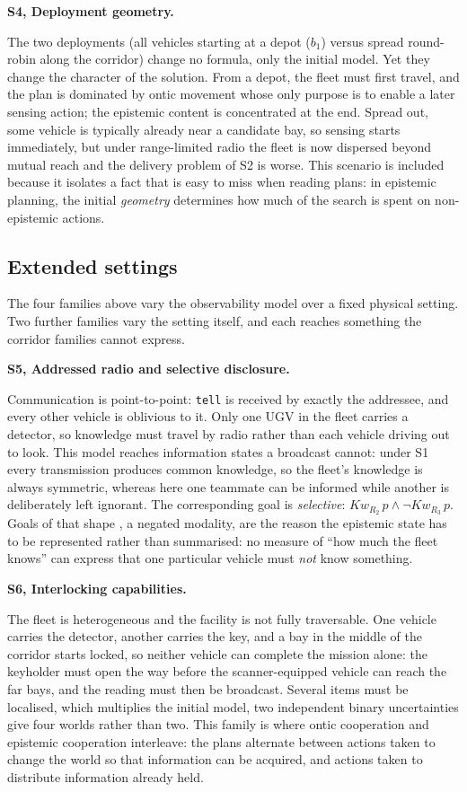 \documentclass[11pt,a4paper]{article}
\theoremstyle{definition}
\newcommand{\Kw}[1]{\mathit{Kw}_{#1}}
\newcommand{\scenariohead}[1]{\vspace{2pt}\noindent\textcolor{steel}{\bfseries #1}\par\vspace{1pt}}
\begin{document}
\scenariohead{S4, Deployment geometry.}
The two deployments (all vehicles starting at a depot ($b_1$) versus spread
round-robin along the corridor) change no formula, only the initial model.
Yet they change the character of the solution. From a depot, the fleet must
first travel, and the plan is dominated by ontic movement whose only purpose is
to enable a later sensing action; the epistemic content is concentrated at the
end. Spread out, some vehicle is typically already near a candidate bay, so
sensing starts immediately, but under range-limited radio the fleet is now
dispersed beyond mutual reach and the delivery problem of S2 is worse. This
scenario is included because it isolates a fact that is easy to miss when
reading plans: in epistemic planning, the initial \emph{geometry} determines
how much of the search is spent on non-epistemic actions.

\subsection{Extended settings}

The four families above vary the observability model over a fixed physical
setting. Two further families vary the setting itself, and each reaches
something the corridor families cannot express.

\scenariohead{S5, Addressed radio and selective disclosure.}
Communication is point-to-point: \texttt{tell} is received by exactly the
addressee, and every other vehicle is oblivious to it. Only one UGV in the
fleet carries a detector, so knowledge must travel by radio rather than each
vehicle driving out to look. This model reaches information states a broadcast
cannot: under S1 every transmission produces common knowledge, so the fleet's
knowledge is always symmetric, whereas here one teammate can be informed while
another is deliberately left ignorant. The corresponding goal is
\emph{selective}: $\Kw{R_2}\,p \wedge \neg\Kw{R_3}\,p$. Goals of that shape , 
a negated modality, are the reason the epistemic state has to be represented
rather than summarised: no measure of ``how much the fleet knows'' can express
that one particular vehicle must \emph{not} know something.

\scenariohead{S6, Interlocking capabilities.}
The fleet is heterogeneous and the facility is not fully traversable. One
vehicle carries the detector, another carries the key, and a bay in the middle
of the corridor starts locked, so neither vehicle can complete the mission
alone: the keyholder must open the way before the scanner-equipped vehicle can
reach the far bays, and the reading must then be broadcast. Several items must
be localised, which multiplies the initial model, two independent binary
uncertainties give four worlds rather than two. This family is where ontic
cooperation and epistemic cooperation interleave: the plans alternate between
actions taken to change the world so that information can be acquired, and
actions taken to distribute information already held.
\end{document}
